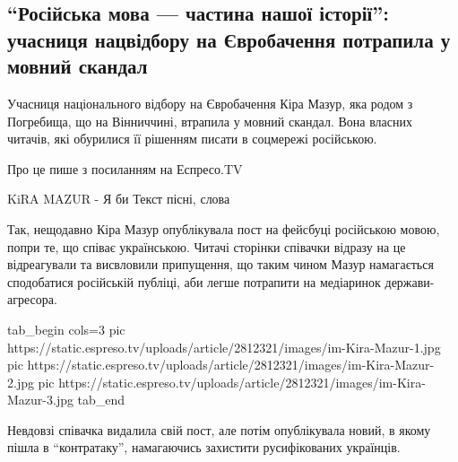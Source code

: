  
 
 
 
 
 
\subsection{``Російська мова --- частина нашої історії'': учасниця нацвідбору на Євробачення потрапила у мовний скандал}
\label{sec:28_11_2020.news.ua.cynicallviv.1.kira_mazur_jazyk}

Учасниця національного відбору на Євробачення Кіра Мазур, яка родом з
Погребища, що на Вінниччині, втрапила у мовний скандал. Вона 
власних читачів, які обурилися її рішенням писати в соцмережі російською.

Про це пише  з посиланням на Еспресо.TV

KiRA MAZUR - Я би Текст пісні, слова

Так, нещодавно Кіра Мазур опублікувала пост на фейсбуці російською мовою, попри
те, що співає українською. Читачі сторінки співачки відразу на це відреагували
та висвловили припущення, що таким чином Мазур намагається сподобатися
російській публіці, аби легше потрапити на медіаринок держави-агресора.

\ifcmt
tab_begin cols=3
  pic https://static.espreso.tv/uploads/article/2812321/images/im-Kira-Mazur-1.jpg
  pic https://static.espreso.tv/uploads/article/2812321/images/im-Kira-Mazur-2.jpg
  pic https://static.espreso.tv/uploads/article/2812321/images/im-Kira-Mazur-3.jpg 
tab_end
\fi

Невдовзі співачка видалила свій пост, але потім опублікувала новий, в якому
пішла в ``контратаку'', намагаючись захистити русифікованих українців.

